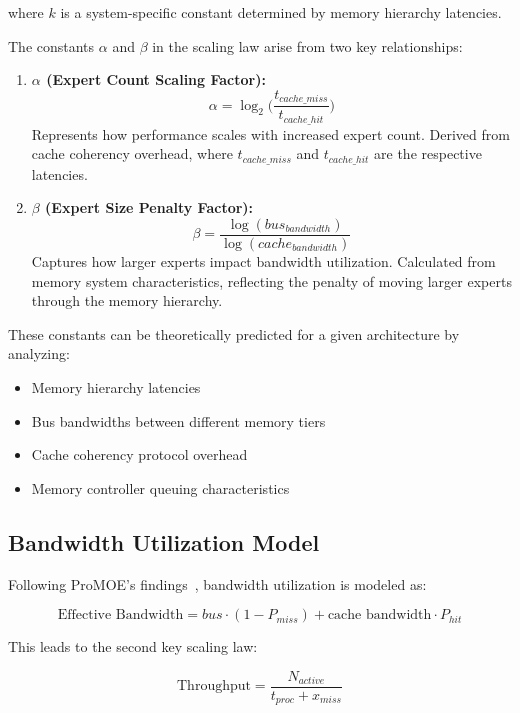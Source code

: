 \documentclass[11pt]{article}
\begin{document}
where $k$ is a system-specific constant determined by memory hierarchy latencies.

The constants $\alpha$ and $\beta$ in the scaling law arise from two key relationships:

\begin{enumerate}
    \item \textbf{$\alpha$ (Expert Count Scaling Factor):}
        \[
        \alpha = \log_2\!\biggl(\frac{t_{cache\_miss}}{t_{cache\_hit}}\biggr)
        \]
        Represents how performance scales with increased expert count. Derived from cache coherency overhead, where $t_{cache\_miss}$ and $t_{cache\_hit}$ are the respective latencies.
    \item \textbf{$\beta$ (Expert Size Penalty Factor):}
        \[
        \beta = \frac{\log(bus_{bandwidth})}{\log(cache_{bandwidth})}
        \]
        Captures how larger experts impact bandwidth utilization. Calculated from memory system characteristics, reflecting the penalty of moving larger experts through the memory hierarchy.
\end{enumerate}

These constants can be theoretically predicted for a given architecture by analyzing:
\begin{itemize}
    \item Memory hierarchy latencies
    \item Bus bandwidths between different memory tiers
    \item Cache coherency protocol overhead
    \item Memory controller queuing characteristics
\end{itemize}

\subsection{Bandwidth Utilization Model}

Following ProMOE's findings~\cite{song2024}, bandwidth utilization is modeled as:

\begin{equation}
\text{Effective Bandwidth} = bus \cdot (1 - P_{miss}) + \text{cache bandwidth} \cdot P_{hit}
\end{equation}

This leads to the second key scaling law:

\begin{equation}
\text{Throughput} = \frac{N_{active}}{t_{proc} + x_{miss}}
\end{equation}
\end{document}
